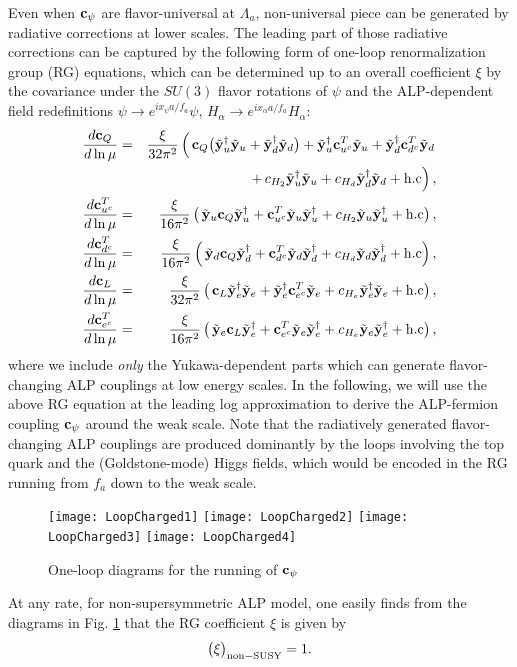 \documentclass[preprint,prd,aps,tighten,nofootinbib,amssymb]{revtex4}
\newcommand{\bea}{\begin{eqnarray}}
\newcommand{\eea}{\end{eqnarray}}
\newcommand{\C}{\bold c}
\newcommand{\Y}{\tilde{\bold  y}}
\begin{document}
Even when $\C_\psi$ are flavor-universal at $\Lambda_a$,  non-universal piece can be generated by radiative corrections at lower scales.
The leading part of those radiative corrections can be captured by the following form of one-loop renormalization group (RG) equations, which can be determined  up to an overall coefficient $\xi$ by the covariance under the $SU(3)$ flavor rotations of $\psi$ and the ALP-dependent field redefinitions $\psi\rightarrow e^{ix_\psi a/f_a} \psi, \, H_\alpha\rightarrow e^{ix_\alpha a/f_a}H_\alpha$: 
\bea
\frac{d\C_Q}{d\ln \mu} & = & \frac{\xi}{32 \pi^2}\left( \, \C_Q \big(\Y_u^\dagger  \Y_u + \Y_d^\dagger \Y_d\big)
 + \Y_u^\dagger \C_{u^c}^T   \Y_u + \Y_d^\dagger \C_{d^c}^T \Y_d \right.\nonumber \\
 && \left. \quad \quad \quad  +\,c_{H_2}\Y_u^\dagger \Y_u +c_{H_d}\Y_d^\dagger \Y_d 
 +{\rm h.c}\right),  \nonumber \\
\frac{d\C_{u^c}^T}{d\ln \mu} & = & \frac{\xi}{16\pi^2}\left( \, \Y_{u} \C_Q \Y_{u}^\dagger +  \C_{u^c}^T \Y_{u} \Y_{u}^\dagger + c_{H_2}\Y_u \Y_u^\dagger + {\rm h.c}  \right),  \nonumber \\
\frac{d\C_{d^c}^T}{d\ln \mu} & = & \frac{\xi}{16\pi^2}\left( \, \Y_{d} \C_Q \Y_{d}^\dagger +  \C_{d^c}^T \Y_{d} \Y_{d}^\dagger + c_{H_d}\Y_d \Y_d^\dagger + {\rm h.c}  \right), \nonumber  \\
\frac{d\C_L}{d\ln \mu} & = & \frac{\xi}{32\pi^2}\left( \, \C_L \Y_e^\dagger \Y_e +\Y_e^\dagger \C_{e^c}^T \Y_e  +c_{H_e}\Y_e^\dagger \Y_e+{\rm h.c} \right), \nonumber  \\
\frac{d\C_{e^c}^T}{d\ln \mu} & = & \frac{\xi}{16\pi^2}\left( \, \Y_{e} \C_L \Y_{e}^\dagger +  \C_{e^c}^T \Y_{e} \Y_{e}^\dagger + c_{H_e}\Y_e \Y_e^\dagger +{\rm h.c} \right), \label{RG}
\eea
where we include {\it only} the Yukawa-dependent parts which can  generate  flavor-changing ALP couplings at low energy scales. 
In the following, we will use the above RG equation at the leading log approximation to derive the ALP-fermion coupling $\C_\psi$ around the weak scale.
Note that the radiatively generated flavor-changing ALP couplings are produced dominantly  by the loops involving the top quark and the (Goldstone-mode) Higgs fields, which would be encoded in the RG running from $f_a$ down to the weak scale.
\begin{figure} 
\centering
\texttt{[image: LoopCharged1]}
\texttt{[image: LoopCharged2]}
\texttt{[image: LoopCharged3]} \hspace{-0.7cm}
\texttt{[image: LoopCharged4]}
\caption{One-loop diagrams for the running of $\C_\psi$}
\label{fig:running_cpsi}
\end{figure}
At any rate, for non-supersymmetric ALP model, one easily finds from the diagrams in Fig. \ref{fig:running_cpsi} that the RG coefficient $\xi$  is given by
\bea
\big(\xi\big)_{\rm non-SUSY}=1.
\eea
\end{document}
